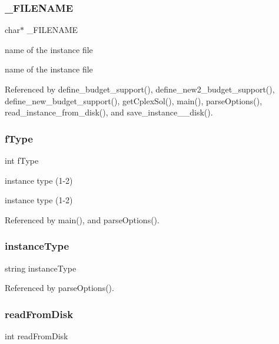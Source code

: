 \mbox{\label{options_8cpp_ab602cefd46d5e616c87e034f4db68854}} 
\subsubsection{\+\_\+\+F\+I\+L\+E\+N\+A\+ME}
{\footnotesize\ttfamily char$\ast$ \+\_\+\+F\+I\+L\+E\+N\+A\+ME}



name of the instance file 

name of the instance file 

Referenced by define\+\_\+budget\+\_\+support(), define\+\_\+new2\+\_\+budget\+\_\+support(), define\+\_\+new\+\_\+budget\+\_\+support(), get\+Cplex\+Sol(), main(), parse\+Options(), read\+\_\+instance\+\_\+from\+\_\+disk(), and save\+\_\+instance\+\_\+\_\+disk().

\mbox{\label{options_8cpp_adf90957b4e032f69aba1e81ab396fa2f}} 
\subsubsection{f\+Type}
{\footnotesize\ttfamily int f\+Type}



instance type (1-\/2) 

instance type (1-\/2) 

Referenced by main(), and parse\+Options().

\mbox{\label{options_8cpp_a98f2e84701105ad45ed7158de7bfdfd0}} 
\subsubsection{instance\+Type}
{\footnotesize\ttfamily string instance\+Type}



Referenced by parse\+Options().

\mbox{\label{options_8cpp_af3966e4eb4b54a626d5def41e2d32c36}} 
\subsubsection{read\+From\+Disk}
{\footnotesize\ttfamily int read\+From\+Disk}



